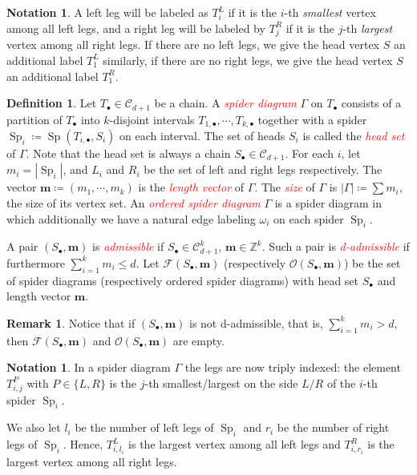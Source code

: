 \documentclass[10pt,a4paper]{amsart}
\theoremstyle{definition}
\newtheorem{defi}[thm]{Definition}
\newtheorem{nota}[thm]{Notation}
\newtheorem{rema}[thm]{Remark}
\newcommand{\bm}[1]{{\boldsymbol{#1}}}
\newcommand\m{\bm{m}}
\newcommand{\important}[1]{\emph{\textcolor{red}{#1}}}
\DeclareMathOperator{\Sp}{Sp}
\newcommand{\D}{{\Gamma}}
\newcommand{\spd}{\mathcal F}
\newcommand{\lspd}{\mathcal O}
\newcommand{\CC}{\mathcal{C}}
\newcommand{\ZZ}{\mathbb{Z}}
\begin{document}
\setcounter{thm}{3}

\begin{nota}\label{notn:label}
	A left leg will be labeled as $T_i^L$ if it is the $i$-th \emph{smallest} vertex among all left legs, and a right leg will be labeled by $T_j^R$ if it is the $j$-th \emph{largest} vertex among all right legs.
	If there are no left legs, we give the head vertex $S$ an additional label $T^L_1$ similarly, if there are no right legs, we give the head vertex $S$ an additional label $T^R_1$. 	
\end{nota}


\setcounter{thm}{5}
\begin{defi}\label{def:sd}
	Let $T_\bullet\in\CC_{d+1}$ be a chain. A \important{spider diagram} $\D$ on $T_\bullet$ consists of a partition of $T_\bullet$ into $k$-disjoint intervals $T_{1,\bullet},\cdots,T_{k,\bullet}$ together with a spider $\Sp_i\coloneqq \Sp(T_{i,\bullet},S_i)$ on each interval. The set of heads $S_i$ is called the \important{head set} of $\D$. Note that the head set is always a chain $S_\bullet\in\CC_{d+1}$. For each $i$, let $m_i=|\Sp_i|$, and $L_i$ and $R_i$ be the set of left and right legs respectively. The vector $\m\coloneqq (m_1,\cdots,m_k)$ is the \important{length vector} of $\D$. The \important{size} of $\D$ is $|\D|\coloneqq \sum m_i$, the size of its vertex set. An \important{ordered spider diagram} $\D$ is a spider diagram in which additionally we have a natural edge labeling $\omega_i$ on each spider $\Sp_i$. 
	
	A pair $(S_\bullet,\m)$ is \important{admissible} if $S_\bullet\in\CC^k_{d+1}$, $\m\in\ZZ^k$. Such a pair is \important{d-admissible} if furthermore $\sum_{i=1}^k{m_i}\leq d$. 
	Let $\spd(S_\bullet,\m)$ (respectively $\lspd(S_\bullet,\m)$) be the set of spider diagrams (respectively ordered spider diagrams) with head set $S_\bullet$ and length vector $\m$.
\end{defi}

\begin{rema}
	Notice that if $(S_\bullet,\m)$ is not d-admissible, that is, $\sum_{i=1}^k{m_i}> d$, then $\spd(S_\bullet,\m)$ and $\lspd(S_\bullet,\m)$ are empty.
\end{rema}

\begin{nota}\label{notn:triple}
	In a spider diagram $\D$ the legs are now triply indexed: the element $T^P_{i,j}$ with $P\in\{L,R\}$ is the $j$-th smallest/largest on the side $L/R$ of the $i$-th spider $\Sp_i$.
	
	We also let $l_i$ be the number of left legs of $\Sp_i$ and $r_i$ be the number of right legs of $\Sp_i.$ Hence, $T^L_{i, l_i}$ is the largest vertex among all left legs and $T^R_{i, r_i}$ is the largest vertex among all right legs.
	
\end{nota}
\end{document}
